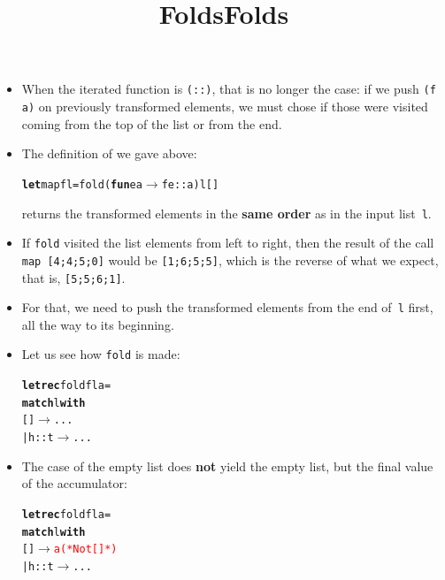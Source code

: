 \documentclass[wide]{slides}
\begin{document}
\begin{slide}
  \title{Folds}

  \begin{itemize}

    \item When the iterated function is \texttt{(::)}, that is no
      longer the case: if we push \texttt{(f a)} on previously
      transformed elements, we must chose if those were visited coming
      from the top of the list or from the end.

    \item The definition of  we gave above:
      \smallskip
\begin{alltt}
\textbf{let} map f l = fold (\textbf{fun} e a \(\rightarrow\) f e :: a) l []
\end{alltt}
      \smallskip
      \noindent returns the transformed elements in the \textbf{same
        order} as in the input list~\texttt{l}.

  \item If \texttt{fold} visited the list elements from left to right,
    then the result of the call \texttt{map [4;4;5;0]} would be
    \texttt{[1;6;5;5]}, which is the reverse of what we expect, that
    is, \texttt{[5;5;6;1]}.

  \item For that, we need to push the transformed elements from the
    end of~\texttt{l} first, all the way to its beginning.

  \end{itemize}

\end{slide}

\begin{slide}
  \title{Folds}

  \begin{itemize}

    \item Let us see how \texttt{fold} is made:
      \smallskip
\begin{alltt}
\textbf{let rec} fold f l a =
  \textbf{match} l \textbf{with}
       [] \(\rightarrow\) ...
  | h::t \(\rightarrow\) ...
\end{alltt}

   \item The case of the empty list does \textbf{not} yield the empty
     list, but the final value of the accumulator:
      \smallskip
\begin{alltt}
\textbf{let rec} fold f l a =
  \textbf{match} l \textbf{with}
       [] \(\rightarrow\) \textcolor{red}{a (* Not [] *)}
  | h::t \(\rightarrow\) ...
\end{alltt}

\end{itemize}

\end{slide}
\end{document}
